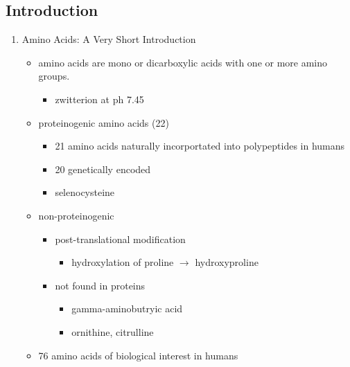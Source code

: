 \documentclass{scrartcl}
\begin{document}
\subsection{Introduction}
\label{sec:orgaeacc0c}
\begin{enumerate}
\item Amino Acids: A Very Short Introduction
\label{sec:org9f18e82}
\begin{itemize}
\item amino acids are mono or dicarboxylic acids with one or more amino groups.
\begin{itemize}
\item zwitterion at ph 7.45
\end{itemize}

\item proteinogenic amino acids (22)
\begin{itemize}
\item 21 amino acids naturally incorportated into polypeptides in humans
\item 20 genetically encoded
\item selenocysteine
\end{itemize}

\item non-proteinogenic
\begin{itemize}
\item post-translational modification
\begin{itemize}
\item hydroxylation of proline \(\to\) hydroxyproline
\end{itemize}
\item not found in proteins
\begin{itemize}
\item gamma-aminobutryic acid
\item ornithine, citrulline
\end{itemize}
\end{itemize}

\item 76 amino acids of biological interest in humans
\end{itemize}


\end{enumerate}
\end{document}
